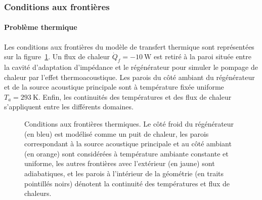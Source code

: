 



\subsubsection{Conditions aux frontières}\label{chap:FEM_CondFront}
\paragraph{Problème thermique}
Les conditions aux frontières du modèle de transfert thermique sont représentées sur la figure~\ref{fig:Comsol_CondFrontT}. Un flux de chaleur $\dot Q_f=\qty{-10}{\watt}$ est retiré à la paroi située entre la cavité d'adaptation d'impédance et le régénérateur pour simuler le pompage de chaleur par l'effet thermoacoustique. Les parois du côté ambiant du régénérateur et de la source acoustique principale sont à température fixée uniforme $T_a=\qty{293}{\kelvin}$. Enfin, les continuités des températures et des flux de chaleur s'appliquent entre les différents domaines.

\begin{figure}[!ht]
		\centering
		
%		
    \caption{Conditions aux frontières thermiques. Le côté froid du régénérateur (en bleu) est modélisé comme un puit de chaleur, les parois correspondant à la source acoustique principale et au côté ambiant (en orange) sont considérées à température ambiante constante et uniforme, les autres frontières avec l'extérieur (en jaune) sont adiabatiques, et les parois à l'intérieur de la géométrie (en traits pointillés noirs) dénotent la continuité des températures et flux de chaleurs.}
    \label{fig:Comsol_CondFrontT}
\end{figure}


